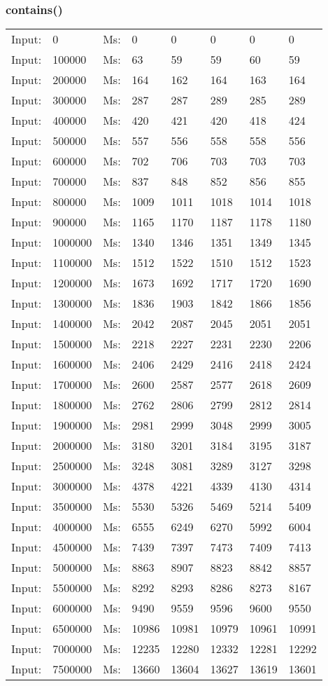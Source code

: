 \documentclass[11pt,a4paper]{report}
\begin{document}
\begin{tiny}
\subsubsection*{contains()}
\begin{tabular}{l l ||l  l  l  l  l  l}
Input:&0&Ms:&0&0&0&0&0\\
Input:&100000&Ms:&63&59&59&60&59\\
Input:&200000&Ms:&164&162&164&163&164\\
Input:&300000&Ms:&287&287&289&285&289\\
Input:&400000&Ms:&420&421&420&418&424\\
Input:&500000&Ms:&557&556&558&558&556\\
Input:&600000&Ms:&702&706&703&703&703\\
Input:&700000&Ms:&837&848&852&856&855\\
Input:&800000&Ms:&1009&1011&1018&1014&1018\\
Input:&900000&Ms:&1165&1170&1187&1178&1180\\
Input:&1000000&Ms:&1340&1346&1351&1349&1345\\
Input:&1100000&Ms:&1512&1522&1510&1512&1523\\
Input:&1200000&Ms:&1673&1692&1717&1720&1690\\
Input:&1300000&Ms:&1836&1903&1842&1866&1856\\
Input:&1400000&Ms:&2042&2087&2045&2051&2051\\
Input:&1500000&Ms:&2218&2227&2231&2230&2206\\
Input:&1600000&Ms:&2406&2429&2416&2418&2424\\
Input:&1700000&Ms:&2600&2587&2577&2618&2609\\
Input:&1800000&Ms:&2762&2806&2799&2812&2814\\
Input:&1900000&Ms:&2981&2999&3048&2999&3005\\
Input:&2000000&Ms:&3180&3201&3184&3195&3187\\
Input:&2500000&Ms:&3248&3081&3289&3127&3298\\
Input:&3000000&Ms:&4378&4221&4339&4130&4314\\
Input:&3500000&Ms:&5530&5326&5469&5214&5409\\
Input:&4000000&Ms:&6555&6249&6270&5992&6004\\
Input:&4500000&Ms:&7439&7397&7473&7409&7413\\
Input:&5000000&Ms:&8863&8907&8823&8842&8857\\
Input:&5500000&Ms:&8292&8293&8286&8273&8167\\
Input:&6000000&Ms:&9490&9559&9596&9600&9550\\
Input:&6500000&Ms:&10986&10981&10979&10961&10991\\
Input:&7000000&Ms:&12235&12280&12332&12281&12292\\
Input:&7500000&Ms:&13660&13604&13627&13619&13601\\
\end{tabular}
\\

\end{tiny}
\end{document}
